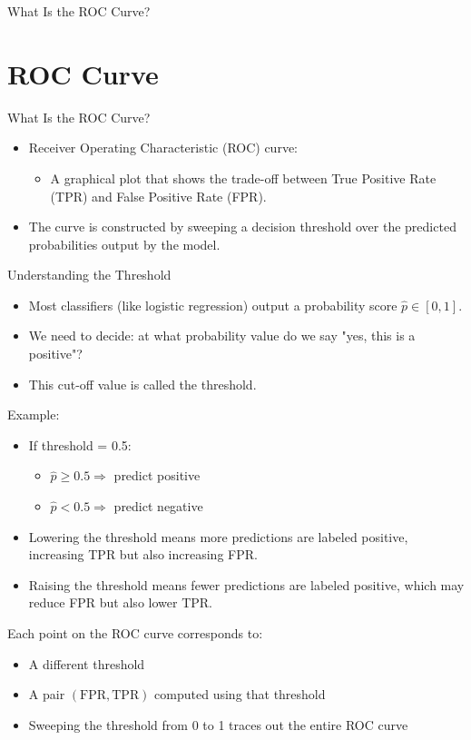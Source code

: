 \documentclass[aspectratio=169]{beamer}
\begin{document}
\begin{frame}[label={sec:org5db1ab0}]{What Is the ROC Curve?}
\end{frame}
\section{ROC Curve}
\label{sec:orgd02bce3}
\begin{frame}[label={sec:orgf63fc57}]{What Is the ROC Curve?}
\begin{itemize}
\item \alert{Receiver Operating Characteristic (ROC) curve}:
\begin{itemize}
\item A graphical plot that shows the trade-off between \alert{True Positive Rate} (TPR) and \alert{False Positive Rate} (FPR).
\end{itemize}
\item The curve is constructed by \alert{sweeping a decision threshold} over the predicted probabilities output by the model.
\end{itemize}
\end{frame}

\begin{frame}[label={sec:org4fb32d4}]{Understanding the Threshold}
\begin{itemize}
\item Most classifiers (like logistic regression) output a probability score \(\hat{p} \in [0, 1]\).
\item We need to decide: \alert{at what probability value do we say "yes, this is a positive"?}
\item This cut-off value is called the \alert{threshold}.
\end{itemize}
\end{frame}

\begin{frame}[label={sec:orgd3db826}]{Example:}
\begin{itemize}
\item If threshold = 0.5:
\begin{itemize}
\item \(\hat{p} \geq 0.5 \Rightarrow\) predict \alert{positive}
\item \(\hat{p} < 0.5 \Rightarrow\) predict \alert{negative}
\end{itemize}
\item Lowering the threshold means more predictions are labeled positive, increasing TPR but also increasing FPR.
\item Raising the threshold means fewer predictions are labeled positive, which may reduce FPR but also lower TPR.
\end{itemize}
\end{frame}

\begin{frame}[label={sec:orgf66081b}]{Each point on the ROC curve corresponds to:}
\begin{itemize}
\item A different threshold
\item A pair \((\text{FPR}, \text{TPR})\) computed using that threshold
\item Sweeping the threshold from 0 to 1 traces out the entire ROC curve
\end{itemize}
\end{frame}
\end{document}
